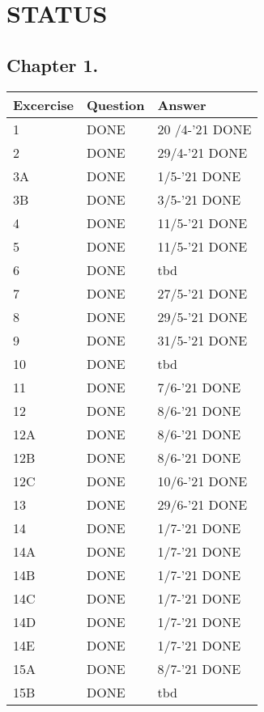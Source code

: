 \section{STATUS}

\subsection*{Chapter 1.}
    \begin{tabular}{|l|l|l|}
        \hline
        \rowcolor[HTML]{EFEFEF}
        {\color[HTML]{000000} Excercise } & {\color[HTML]{000000} Question } & {\color[HTML]{000000} Answer } \\ \hline
        1 & DONE & 20 /4-'21 DONE \\ \hline
        2 & DONE & 29/4-'21 DONE \\ \hline
        3A & DONE & 1/5-'21 DONE \\ \hline
        3B & DONE & 3/5-'21 DONE \\ \hline
        4 & DONE & 11/5-'21 DONE \\ \hline
        5 & DONE & 11/5-'21 DONE \\ \hline
        6 & DONE & tbd \\ \hline
        7 & DONE & 27/5-'21 DONE \\ \hline
        8 & DONE & 29/5-'21 DONE \\ \hline
        9 & DONE & 31/5-'21 DONE \\ \hline
        10 & DONE & tbd \\ \hline
        11 & DONE & 7/6-'21 DONE \\ \hline
        12 & DONE & 8/6-'21 DONE \\ \hline
        12A & DONE & 8/6-'21 DONE \\ \hline
        12B & DONE & 8/6-'21 DONE \\ \hline
        12C & DONE & 10/6-'21 DONE \\ \hline
        13 & DONE & 29/6-'21 DONE \\ \hline
        14 & DONE & 1/7-'21 DONE \\ \hline
        14A & DONE & 1/7-'21 DONE \\ \hline
        14B & DONE & 1/7-'21 DONE \\ \hline
        14C & DONE & 1/7-'21 DONE \\ \hline
        14D & DONE & 1/7-'21 DONE \\ \hline
        14E & DONE & 1/7-'21 DONE \\ \hline
        15A & DONE & 8/7-'21 DONE \\ \hline
        15B & DONE & tbd \\ \hline
    \end{tabular}


